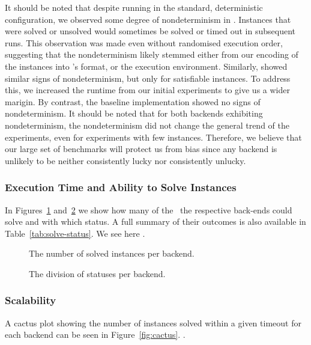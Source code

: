 \documentclass[acmsmall,review,anonymous]{acmart}\settopmatter{printfolios=true,printccs=false,printacmref=true}
\theoremstyle{definition}
\begin{document}
It should be noted that despite running in the standard, deterministic configuration, we observed some degree of nondeterminism in \Nuxmv. Instances that were solved or unsolved would sometimes be solved or timed out in subsequent runs. This observation was made even without randomised execution order, suggesting that the nondeterminism likely stemmed either from our encoding of the instances into \Nuxmv's format, or the execution environment. Similarly, \Calculus{} showed similar signs of nondeterminism, but only for satisfiable instances. To address this, we increased the runtime from our initial experiments to give us a wider marigin. By contrast, the baseline implementation showed no signs of nondeterminism. It should be noted that for both backends exhibiting nondeterminism, the nondeterminism did not change the general trend of the experiments, even for experiments with few instances. Therefore, we believe that our large set of benchmarks will protect us from bias since any backend is unlikely to be neither consistently lucky nor consistently unlucky.

\subsubsection{Execution Time and Ability to Solve Instances}\label{sec:runtime}

In Figures~\ref{fig:solve-nr} and~\ref{fig:solve-division} we show how many of the~\NrBenchmarks{} the respective back-ends could solve and with which status. A full summary of their outcomes is also available in Table~\ref{tab:solve-status}. We see here .

\begin{figure}
  \caption{The number of solved instances per backend.}
  \label{fig:solve-nr}
\end{figure}

\begin{figure}
  \caption{The division of statuses per backend.}
  \label{fig:solve-division}
\end{figure}

\subsubsection{Scalability}\label{sec:scaling}

A cactus plot showing the number of instances solved within a given timeout for each backend can be seen in Figure~\ref{fig:cactus}. .
\end{document}
